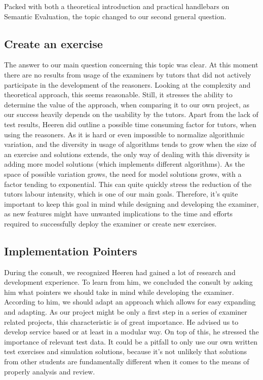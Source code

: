 Packed with both a theoretical introduction and practical handlebars on
Semantic Evaluation, the topic changed to our second general question.

\subsection{Create an exercise}
The answer to our main question concerning this topic was clear. At this moment
there are no results from usage of the examiners by tutors that did not
actively participate in the development of the reasoners. Looking at the 
complexity and theoretical approach, this seems reasonable. Still, it stresses
the ability to determine the value of the approach, when comparing it to our 
own project, as our success heavily depends on the usability by the tutors. 
Apart from the lack of test results, Heeren did outline a possible time
consuming factor for tutors, when using the reasoners. As it is hard or even 
impossible to normalize algorithmic variation, and the diversity in usage of 
algorithms tends to grow when the size of an exercise and solutions extends, 
the only way of dealing with this diversity is adding more model solutions 
(which implements different algorithms). 
As the space of possible variation grows, the need
for model solutions grows, with a factor tending to exponential. This can 
quite quickly stress the reduction of the tutors labour intensity, which is one 
of our main goals. Therefore, it's quite important to keep this goal in mind
while designing and developing the examiner, as new features might have 
unwanted implications to the time and efforts required to successfully deploy 
the \gls{examiner} or create new \glspl{exercise}.

\subsection{Implementation Pointers}
During the consult, we recognized Heeren had gained a lot of research and 
development experience. To learn from him, we concluded the consult by 
asking him what pointers we should take in mind while developing the 
\gls{examiner}. According to him, we should adapt an approach which allows for 
easy expanding and adapting. As our project might be only a first step in a
series of \gls{examiner} related projects, this characteristic is of great 
importance. He advised us to develop service based or at least in a modular 
way. On top of this, he stressed the importance of relevant test data. It
could be a pitfall to only use our own written test exercises and simulation 
solutions, because it's not unlikely that solutions from other students are 
fundamentally different when it comes to the means of properly analysis and review.

